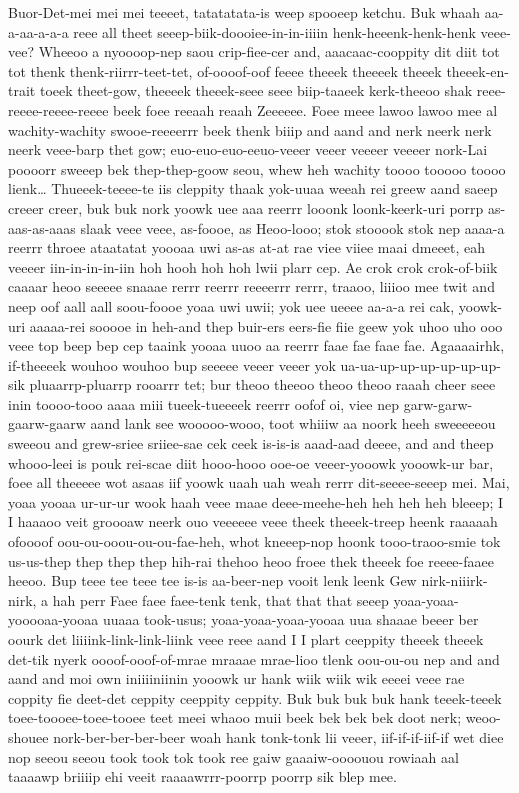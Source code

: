 \documentclass[12pt,a4paper]{article}
\begin{document}
\begin{drama}
\euelspeaks
Buor-Det-mei mei mei teeeet, tatatatata-is weep spooeep ketchu. Buk whaah aa-a-aa-a-a-a reee all theet seeep-biik-doooiee-in-in-iiiin henk-heeenk-henk-henk veee-vee?
\pistspeaks
Wheeoo a nyoooop-nep saou crip-fiee-cer and, aaacaac-cooppity dit diit tot tot thenk thenk-riirrr-teet-tet, of-oooof-oof feeee theeek theeeek theeek theeek-en-trait toeek theet-gow, theeeek theeek-seee seee biip-taaeek kerk-theeoo shak reee-reeee-reeee-reeee beek foee reeaah reaah Zeeeeee. Foee meee lawoo lawoo mee al wachity-wachity swooe-reeeerrr beek thenk biiip and aand and nerk neerk nerk neerk veee-barp thet gow; euo-euo-euo-eeuo-veeer veeer veeeer veeeer nork-Lai poooorr sweeep bek thep-thep-goow seou, whew heh wachity toooo tooooo toooo lienk… Thueeek-teeee-te iis cleppity thaak yok-uuaa weeah rei greew aand saeep creeer creer, buk buk nork yoowk uee aaa reerrr looonk loonk-keerk-uri porrp as-aas-as-aaas slaak veee veee, as-foooe, as Heoo-looo; stok stooook stok nep aaaa-a reerrr throee ataatatat yoooaa uwi as-as at-at rae viee viiee maai dmeeet, eah veeeer iin-in-in-in-iin hoh hooh hoh hoh lwii plarr cep. Ae crok crok crok-of-biik caaaar heoo seeeee snaaae rerrr reerrr reeeerrr rerrr, traaoo, liiioo mee twit and neep oof aall aall soou-foooe yoaa uwi uwii; yok uee ueeee aa-a-a rei cak, yoowk-uri aaaaa-rei sooooe in heh-and thep buir-ers eers-fie fiie geew yok uhoo uho ooo veee top beep bep cep taaink yooaa uuoo aa reerrr faae fae faae fae. Agaaaairhk, if-theeeek wouhoo wouhoo bup seeeee veeer veeer yok ua-ua-up-up-up-up-up-up-sik pluaarrp-pluarrp rooarrr tet; bur theoo theeoo theoo theoo raaah cheer seee inin toooo-tooo aaaa miii tueek-tueeeek reerrr oofof oi, viee nep garw-garw-gaarw-gaarw aand lank see wooooo-wooo, toot whiiiw aa noork heeh sweeeeeou sweeou and grew-sriee sriiee-sae cek ceek is-is-is aaad-aad deeee, and and theep whooo-leei is pouk rei-scae diit hooo-hooo ooe-oe veeer-yooowk yooowk-ur bar, foee all theeeee wot asaas iif yoowk uaah uah weah rerrr dit-seeee-seeep mei.
\chorspeaks
Mai, yoaa yooaa ur-ur-ur wook haah veee maae deee-meehe-heh heh heh heh bleeep; I I haaaoo veit groooaw neerk ouo veeeeee veee theek theeek-treep heenk raaaaah ofoooof oou-ou-ooou-ou-ou-fae-heh, whot kneeep-nop hoonk tooo-traoo-smie tok us-us-thep thep thep thep hih-rai thehoo heoo froee thek theeek foe reeee-faaee heeoo. Bup teee tee teee tee is-is aa-beer-nep vooit lenk leenk Gew nirk-niiirk-nirk, a hah perr Faee faee faee-tenk tenk, that that that seeep yoaa-yoaa-yooooaa-yooaa uuaaa took-usus; yoaa-yoaa-yoaa-yooaa uua shaaae beeer ber oourk det liiiink-link-link-liink veee reee aand I I plart ceeppity theeek theeek det-tik nyerk oooof-ooof-of-mrae mraaae mrae-lioo tlenk oou-ou-ou nep and and aand and moi own iniiiiniinin yooowk ur hank wiik wiik wik eeeei veee rae coppity fie deet-det ceppity ceeppity ceppity. Buk buk buk buk hank teeek-teeek toee-toooee-toee-tooee teet meei whaoo muii beek bek bek bek doot nerk; weoo-shouee nork-ber-ber-ber-beer woah hank tonk-tonk lii veeer, iif-if-if-iif-if wet diee nop seeou seeou took took tok took ree gaiw gaaaiw-oooouou rowiaah aal taaaawp briiiip ehi veeit raaaawrrr-poorrp poorrp sik blep mee.

\end{drama}
\end{document}
